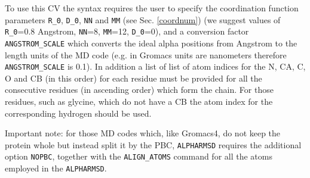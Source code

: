 \documentclass[12pt,fleqn]{report}
\begin{document}

To use this CV the syntax requires the user to specify the coordination function parameters 
{\tt R\_0}, {\tt D\_0}, {\tt NN} and {\tt MM} (see Sec. \ref{coordnum})
(we suggest values of {\tt R\_0}=0.8 Angstrom, {\tt NN}=8, {\tt MM}=12, {\tt D\_0}=0),
and a conversion factor {\tt ANGSTROM\_SCALE} which converts the ideal alpha positions
from Angstrom to the length units of the MD code 
(e.g. in Gromacs units are nanometers therefore {\tt ANGSTROM\_SCALE} is 0.1).
In addition a list of list of atom indices for the N, CA, C, O and CB (in this order) for each residue 
must be provided for all the consecutive residues (in ascending order) which form the chain.  For those 
residues, such as glycine, which do not have a CB the atom index for the corresponding hydrogen should
be used.

Important note: for those MD codes which, like Gromacs4, do not keep the protein whole but instead split it by the PBC, 
 {\tt ALPHARMSD} requires the additional option {\tt NOPBC}, together
with the {\tt ALIGN\_ATOMS} command for all the atoms employed in the {\tt ALPHARMSD}.
\end{document}
